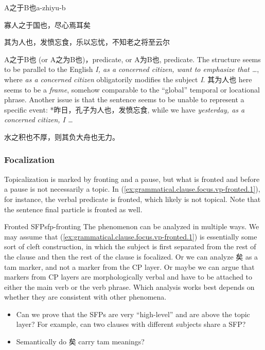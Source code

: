 \documentclass[UTF8, a4paper, oneside, scheme=plain, 12pt]{ctexrep}
\newcommand{\form}[1]{\emph{#1}}
\begin{document}
\begin{todobox}{A之于B也}{a-zhiyu-b}
    \begin{exe}
        \ex 寡人之于国也，尽心焉耳矣
    \end{exe}

    \begin{exe}
        \ex 其为人也，发愤忘食，乐以忘忧，不知老之将至云尔
    \end{exe}

    A之于B也 (or A之为B也)，predicate, or A为B也, predicate.
    The structure seems to be parallel to the English
    \form{I, as a concerned citizen, want to emphasize that \dots},
    where \form{as a concerned citizen} obligatorily modifies the subject \form{I}.
    其为人也 here seems to be a \emph{frame}, somehow comparable to the ``global'' temporal or locational phrase.
    Another issue is that the sentence seems to be unable to represent a specific event:
    *昨日，孔子为人也，发愤忘食, while we have \form{yesterday, as a concerned citizen, I \dots}
    
    \begin{exe}
        \ex 水之积也不厚，则其负大舟也无力。
    \end{exe}

\end{todobox}

\subsubsection{Focalization}

Topicalization is marked by fronting and a pause,
but what is fronted and before a pause is not necessarily a topic.
In (\ref{ex:grammatical.clause.focus.vp-fronted.1}),
for instance, the verbal predicate is fronted,
which likely is not topical.
Note that the sentence final particle is fronted as well.

\begin{todobox}{Fronted SFP}{sfp-fronting}
    The phenomenon can be analyzed in multiple ways.
    We may assume that (\ref{ex:grammatical.clause.focus.vp-fronted.1}) is essentially some sort of cleft construction,
    in which the subject is first separated from the rest of the clause
    and then the rest of the clause is focalized.
    Or we can analyze 矣 as a \ac{tam} marker, and not a marker from the CP layer.
    Or maybe we can argue that markers from CP layers are morphologically verbal
    and have to be attached to either the main verb or the verb phrase.
    Which analysis works best depends on whether they are consistent with other phenomena.
    \begin{itemize}
        \item Can we prove that the SFPs are very ``high-level'' and are above the topic layer? For example, can two clauses with different subjects share a SFP?
        \item Semantically do 矣 carry \ac{tam} meanings?
    \end{itemize}
\end{todobox}
\end{document}
